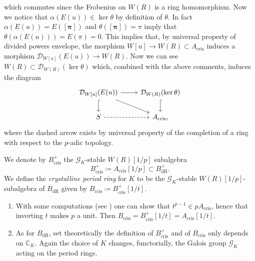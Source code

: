 \begin{rem}[]
	which commutes since the Frobenius on $W(R)$ is a ring homomorphism.
	Now we notice that $\alpha(E(u)) \in \ker\theta$
	by definition of $\theta$.
	In fact $\alpha(E(u)) = E(\left[ \boldsymbol\pi \right])$
	and $\theta([\boldsymbol\pi]) = \pi$ imply that $\theta(\alpha(E(u))) = E(\pi) = 0$.
	This implies that, by universal property of divided powers envelope,
	the morphism $W[u] \to W(R) \subset A_{\mathrm{cris}}$
	induces a morphism $\mathcal{D}_{W[u]}(E(u)) \to W(R)$.
	Now we can see $W(R) \subset \mathcal{D}_{W(R)}(\ker\theta)$
	which, combined with the above comments, induces the diagram
	\begin{equation*}
	\begin{tikzcd}
		\mathcal{D}_{W[u]}(E(u)) \arrow[r, "", rightarrow] 
		\arrow[d, "", hookrightarrow] 
		\arrow[rd, "", rightarrow] &
		\mathcal{D}_{W(R)}(\ker\theta) \arrow[d, "", hookrightarrow] \\
		S \arrow[r, "", dashrightarrow] &
		A_{\mathrm{cris}}
	,\end{tikzcd}
	\end{equation*}
	where the dashed arrow exists by universal property of the completion
	of a ring with respect to the $p$-adic topology.
\end{rem}


\begin{defn}[]
	We denote by $B_{\mathrm{cris}}^+$ the $\mathscr{G}_K$-stable $W(R)[1/p]$ subalgebra 
	\begin{equation*}
	B_{\mathrm{cris}}^+ \coloneqq A_{\mathrm{cris}}[1/p] \subset B_{\mathrm{dR}}^+
	.\end{equation*}
	We define the \emph{crystalline period ring} for $K$
	to be the $\mathscr{G}_K$-stable $W(R)[1/p]$-subalgebra of $B_{\mathrm{dR}}$
	given by $B_{\mathrm{cris}} \coloneqq B_{\mathrm{cris}}^+[1/t]$.
\end{defn}


\begin{rem}[]\leavevmode\vspace{-.2\baselineskip}
\begin{enumerate}
\item With some computations (see \cite[Proposition 9.1.3]{Brinon})
	one can show that $t^{p-1} \in p A_{\mathrm{cris}}$, hence that 
	inverting $t$ makes $p$ a unit.
	Then $B_{\mathrm{cris}} = B_{\mathrm{cris}}^+[1/t] = A_{\mathrm{cris}}[1/t]$.

\item As for $B_{\mathrm{dR}}$, set theoretically the definition of $B_{\mathrm{cris}}^+$ and
	of $B_{\mathrm{cris}}$ only depends on $\mathbb{C}_{K}$.
	Again the choice of $K$ changes, functorially, the Galois group $\mathscr{G}_K$ acting on the
	period rings.
\end{enumerate}
\end{rem}


